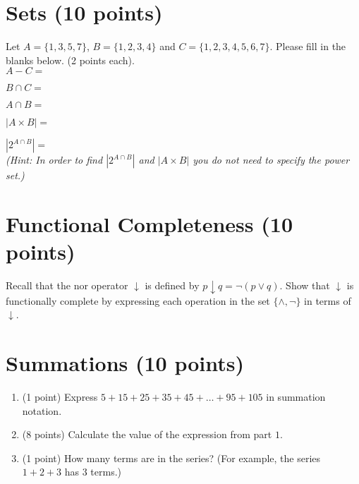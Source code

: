\documentclass[11pt]{article}
\def\sectionOneA#1{}
\def\sectionOneB#1{}
\def\sectionTwoA#1{}
\def\sectionTwoB#1{}
\def\sectionVicsection#1{#1}
\newcounter{pgpts}
\newcounter{cumpts}
\newcommand{\cnewpage}{\addtocounter{cumpts}{\value{pgpts}}\newpage\setcounter{pgpts}{0}}
\begin{document}
\cnewpage

\section{Sets (10 points)}\addtocounter{pgpts}{10}

Let \sectionOneA{$A=\{4,6,8\}$}\sectionOneB{$A=\{1,5,9\}$}\sectionTwoA{$A=\{3,6,9\}$}\sectionTwoB{$A=\{4,7,10\}$}
\sectionVicsection{$A=\{1,3,5,7\}$, $B=\{1,2,3,4\}$}
and $C=\{1,2,3,4,5,6,7\}$. Please fill in the blanks below. (2 points each).\\[5ex]

$A - C = $
\vspace*{1cm}

$B\cap C=$
\vspace*{1cm}

 $A\cap B =$ 
\vspace*{1cm}

\sectionOneA{$A \times \{1\} = $}
\sectionOneB{$A \times \{1\} = $} %
\sectionTwoA{$\{1\} \times A = $}
\sectionTwoB{$\{1\} \times A = $} %
\sectionVicsection{$|A \times B|=$}

\vspace*{1cm}
 
 $|2^{A\cap B}| = $\\ 
\vspace*{0.5cm}
{\em (Hint: In order to find $|2^{A\cap B}|$ and $|A\times B|$ you do not need to specify the power set.)}
\vspace{1cm}
\section{Functional Completeness (10 points)}\addtocounter{pgpts}{10}
Recall that the nor operator $\downarrow$ is defined by $p\downarrow q = \neg (p \vee q)$. Show that $\downarrow$ is functionally complete by expressing each operation in the set $\{\wedge, \neg\}$ in terms of $\downarrow$.

\cnewpage
\section{Summations (10 points)}\addtocounter{pgpts}{10}
\begin{enumerate}
    \item (1 point) Express $5+15+25+35+45+\dots+95+105$ in summation notation.
    \vspace{3cm}
    \item (8 points) Calculate the value of the expression from part $1$.
    \vspace{3cm}
    \item (1 point) How many terms are in the series? (For example, the series $1+2+3$ has $3$ terms.)
    \vspace{3cm}
\end{enumerate}
\end{document}
